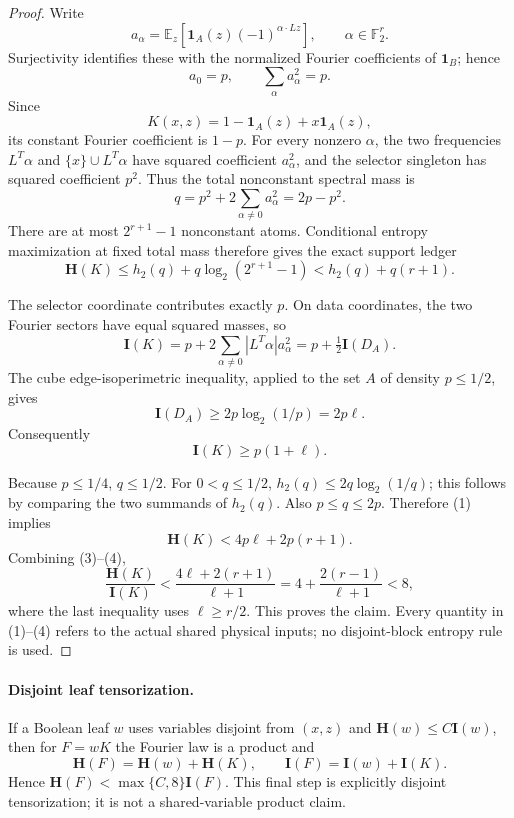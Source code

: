\begin{proof}
Write
\[
 a_\alpha=\mathbb E_z\left[\mathbf1_A(z)
       (-1)^{\alpha\cdot Lz}\right],\qquad \alpha\in\mathbb F_2^r.
\]
Surjectivity identifies these with the normalized Fourier
coefficients of $\mathbf1_B$; hence
\[
 a_0=p,\qquad \sum_\alpha a_\alpha^2=p.
\]
Since
\[
 K(x,z)=1-\mathbf1_A(z)+x\mathbf1_A(z),
\]
its constant Fourier coefficient is $1-p$.  For every nonzero
$\alpha$, the two frequencies $L^T\alpha$ and
$\{x\}\cup L^T\alpha$ have squared coefficient $a_\alpha^2$,
and the selector singleton has squared coefficient $p^2$.
Thus the total nonconstant spectral mass is
\[
 q=p^2+2\sum_{\alpha\ne0}a_\alpha^2=2p-p^2.
\]
There are at most $2^{r+1}-1$ nonconstant atoms.  Conditional
entropy maximization at fixed total mass therefore gives the exact
support ledger
\[
 \mathbf H(K)
 \le h_2(q)+q\log_2(2^{r+1}-1)
 < h_2(q)+q(r+1).                                      \tag{1}
\]

The selector coordinate contributes exactly $p$.  On data
coordinates, the two Fourier sectors have equal squared masses, so
\[
 \mathbf I(K)=p+2\sum_{\alpha\ne0}|L^T\alpha|a_\alpha^2
             =p+\tfrac12\mathbf I(D_A).                \tag{2}
\]
The cube edge-isoperimetric inequality, applied to the set $A$ of
density $p\le1/2$, gives
\[
 \mathbf I(D_A)\ge2p\log_2(1/p)=2p\ell.
\]
Consequently
\[
 \mathbf I(K)\ge p(1+\ell).                            \tag{3}
\]

Because $p\le1/4$, $q\le1/2$.  For $0<q\le1/2$,
$h_2(q)\le2q\log_2(1/q)$; this follows by comparing the two
summands of $h_2(q)$.  Also $p\le q\le2p$.  Therefore (1) implies
\[
 \mathbf H(K)<4p\ell+2p(r+1).                          \tag{4}
\]
Combining (3)--(4),
\[
 \frac{\mathbf H(K)}{\mathbf I(K)}
 <\frac{4\ell+2(r+1)}{\ell+1}
 =4+\frac{2(r-1)}{\ell+1}<8,
\]
where the last inequality uses $\ell\ge r/2$.  This proves the
claim.  Every quantity in (1)--(4) refers to the actual shared
physical inputs; no disjoint-block entropy rule is used.
\end{proof}

\paragraph{Disjoint leaf tensorization.}
If a Boolean leaf $w$ uses variables disjoint from $(x,z)$ and
$\mathbf H(w)\le C\mathbf I(w)$, then for $F=wK$ the Fourier law is
a product and
\[
 \mathbf H(F)=\mathbf H(w)+\mathbf H(K),\qquad
 \mathbf I(F)=\mathbf I(w)+\mathbf I(K).
\]
Hence $\mathbf H(F)<\max\{C,8\}\mathbf I(F)$.  This final step is
explicitly disjoint tensorization; it is not a shared-variable
product claim.
